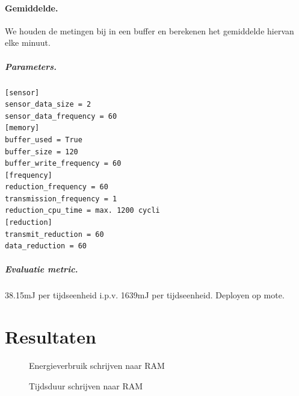 \documentclass{article}
\makeatletter
\def\tikzscale{1}\begin{lrbox}{\measure@tikzpicture}%
\edef\tikzscale{\pgfmathresult}%
\makeatother
\begin{document}
\paragraph{Gemiddelde.} We houden de metingen bij in een buffer en berekenen het
gemiddelde hiervan elke minuut.

\subparagraph{Parameters.}
\begin{verbatim}
[sensor]
sensor_data_size = 2
sensor_data_frequency = 60
[memory]
buffer_used = True
buffer_size = 120
buffer_write_frequency = 60
[frequency]
reduction_frequency = 60
transmission_frequency = 1
reduction_cpu_time = max. 1200 cycli
[reduction]
transmit_reduction = 60
data_reduction = 60
\end{verbatim}

\subparagraph{Evaluatie metric.} 38.15mJ per tijdseenheid i.p.v. 1639mJ per tijdseenheid. Deployen op mote.

\section{Resultaten}

\begin{figure}[h]
\centering
\begin{scaletikzpicturetowidth}{\columnwidth}
\end{scaletikzpicturetowidth}
\caption{Energieverbruik schrijven naar RAM}
\label{fig:energieverbruik_ram}
\end{figure}

\begin{figure}[h]
\centering
\begin{scaletikzpicturetowidth}{\columnwidth}
\end{scaletikzpicturetowidth}
\caption{Tijdsduur schrijven naar RAM}
\label{fig:tijdsduur_ram}
\end{figure}
\end{document}

